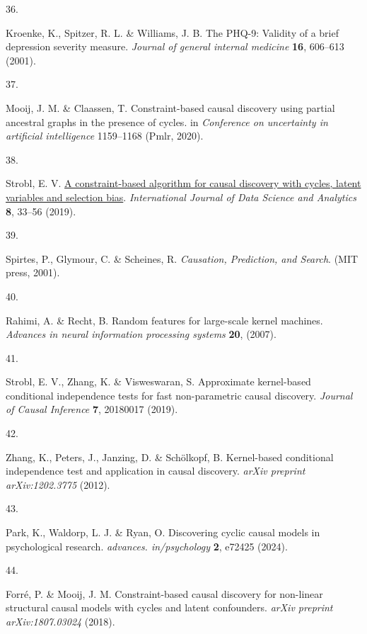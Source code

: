\documentclass[
]{article}
\newlength{\cslhangindent}
\newlength{\csllabelwidth}
\newenvironment{CSLReferences}[2] %
 {\begin{list}{}{%
  \setlength{\itemindent}{0pt}
  \setlength{\leftmargin}{0pt}
  \setlength{\parsep}{0pt}
  \ifodd #1
   \setlength{\leftmargin}{\cslhangindent}
   \setlength{\itemindent}{-1\cslhangindent}
  \fi
  \setlength{\itemsep}{#2\baselineskip}}}
 {\end{list}}
\newcommand{\CSLLeftMargin}[1]{\parbox[t]{\csllabelwidth}{\strut#1\strut}}
\newcommand{\CSLRightInline}[1]{\parbox[t]{\linewidth - \csllabelwidth}{\strut#1\strut}}
\begin{document}
\begin{CSLReferences}{0}{0}
\CSLLeftMargin{36. }%
\CSLRightInline{Kroenke, K., Spitzer, R. L. \& Williams, J. B. The
PHQ-9: Validity of a brief depression severity measure. \emph{Journal of
general internal medicine} \textbf{16}, 606--613 (2001).}

\CSLLeftMargin{37. }%
\CSLRightInline{Mooij, J. M. \& Claassen, T. Constraint-based causal
discovery using partial ancestral graphs in the presence of cycles. in
\emph{Conference on uncertainty in artificial intelligence} 1159--1168
(Pmlr, 2020).}

\CSLLeftMargin{38. }%
\CSLRightInline{Strobl, E. V.
\href{https://doi.org/10.1007/s41060-018-0158-2}{A constraint-based
algorithm for causal discovery with cycles, latent variables and
selection bias}. \emph{International Journal of Data Science and
Analytics} \textbf{8}, 33--56 (2019).}

\CSLLeftMargin{39. }%
\CSLRightInline{Spirtes, P., Glymour, C. \& Scheines, R.
\emph{Causation, Prediction, and Search}. (MIT press, 2001).}

\CSLLeftMargin{40. }%
\CSLRightInline{Rahimi, A. \& Recht, B. Random features for large-scale
kernel machines. \emph{Advances in neural information processing
systems} \textbf{20}, (2007).}

\CSLLeftMargin{41. }%
\CSLRightInline{Strobl, E. V., Zhang, K. \& Visweswaran, S. Approximate
kernel-based conditional independence tests for fast non-parametric
causal discovery. \emph{Journal of Causal Inference} \textbf{7},
20180017 (2019).}

\CSLLeftMargin{42. }%
\CSLRightInline{Zhang, K., Peters, J., Janzing, D. \& Schölkopf, B.
Kernel-based conditional independence test and application in causal
discovery. \emph{arXiv preprint arXiv:1202.3775} (2012).}

\CSLLeftMargin{43. }%
\CSLRightInline{Park, K., Waldorp, L. J. \& Ryan, O. Discovering cyclic
causal models in psychological research. \emph{advances. in/psychology}
\textbf{2}, e72425 (2024).}

\CSLLeftMargin{44. }%
\CSLRightInline{Forré, P. \& Mooij, J. M. Constraint-based causal
discovery for non-linear structural causal models with cycles and latent
confounders. \emph{arXiv preprint arXiv:1807.03024} (2018).}


\end{CSLReferences}
\end{document}
